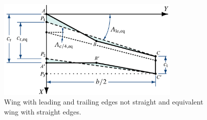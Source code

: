 \documentclass[[12pt,twoside]{book}
\begin{document}
\begin{figure}[t]%
\checkoddpage
  \includegraphics[width=0.78\textwidth]{Chapter_2/equivalent_plan_form_of_a_cranked_wing/equivalent_wing.pdf}
  \caption{
         Wing with leading and trailing edges not straight and equivalent wing with straight edges.}
 \label{fig:Equivalent:Wing:Planform:Defs}%
\end{figure}
\end{document}
